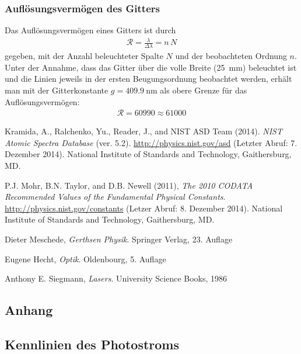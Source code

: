 \documentclass[11pt, a4paper]{article}
\numberwithin{equation}{section}
\begin{document}
\subsubsection{Auflösungsvermögen des Gitters}
Das Auflösungsvermögen eines Gitters ist durch
\begin{align*}
\mathcal{R}=\frac{\lambda}{\Delta\lambda}=n\,N
\end{align*}
gegeben, mit der Anzahl beleuchteter Spalte $N$ und der beobachteten Ordnung $n$. Unter der Annahme, dass das Gitter über die volle Breite (\SI{25}{\milli\metre}) beleuchtet ist und die Linien jeweils in der ersten Beugungsordnung beobachtet werden, erhält man mit der Gitterkonstante $g=\SI{409.9}{\nano\metre}$ als obere Grenze für das Auflösungsvermögen:
\begin{align*}
\mathcal{R}=60990\approx 61000
\end{align*}


\begin{thebibliography}{9}

	Kramida, A., Ralchenko, Yu., Reader, J., and NIST ASD Team (2014).
	\emph{NIST Atomic Spectra Database} (ver. 5.2).
	\url{http://physics.nist.gov/asd} (Letzter Abruf: 7. Dezember 2014).
	National Institute of Standards and Technology, Gaithersburg, MD.

	P.J. Mohr, B.N. Taylor, and D.B. Newell (2011),
	\emph{The 2010 CODATA Recommended Values of the Fundamental Physical Constants}.
	\url{http://physics.nist.gov/constants} (Letzer Abruf: 8. Dezember 2014).
	National Institute of Standards and Technology, Gaithersburg, MD.
	
	Dieter Meschede,
	\emph{Gerthsen Physik}.
	Springer Verlag,
	23. Auflage

	Eugene Hecht,
	\emph{Optik}.
	Oldenbourg,
	5. Auflage

	Anthony E. Siegmann,
	\emph{Lasers}.
	University Science Books,
	1986

 
\end{thebibliography}

\begin{appendix}
\section{Anhang}
\subsection{Kennlinien des Photostroms}
\label{app:kennlinien}
\FloatBarrier


\end{appendix}
\end{document}
